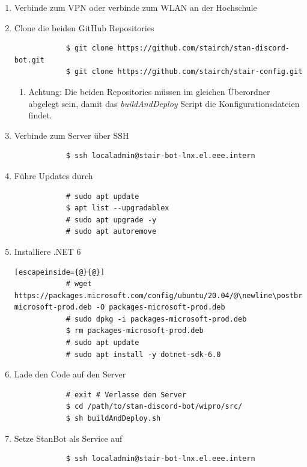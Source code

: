 \documentclass[a4paper, table]{article}
\begin{document}
\begin{enumerate}
    \item Verbinde zum VPN oder verbinde zum WLAN an der Hochschule
    \item Clone die beiden GitHub Repositories
        \begin{lstlisting}
            $ git clone https://github.com/stairch/stan-discord-bot.git
            $ git clone https://github.com/stairch/stair-config.git
        \end{lstlisting}
        \begin{enumerate}
            \item Achtung: Die beiden Repositories müssen im gleichen Überordner abgelegt sein, damit das \textit{buildAndDeploy} Script die Konfigurationsdateien findet.
        \end{enumerate}
    \item Verbinde zum Server über SSH
        \begin{lstlisting}
            $ ssh localadmin@stair-bot-lnx.el.eee.intern
        \end{lstlisting}
    \item Führe Updates durch
        \begin{lstlisting}
            # sudo apt update
            $ apt list --upgradablex
            # sudo apt upgrade -y
            # sudo apt autoremove
        \end{lstlisting}
    \item Installiere .NET 6
        \begin{lstlisting}[escapeinside={@}{@}]
            # wget https://packages.microsoft.com/config/ubuntu/20.04/@\newline\postbreak@packages-microsoft-prod.deb -O packages-microsoft-prod.deb
            # sudo dpkg -i packages-microsoft-prod.deb
            $ rm packages-microsoft-prod.deb
            # sudo apt update
            # sudo apt install -y dotnet-sdk-6.0
        \end{lstlisting}
    \item Lade den Code auf den Server
        \begin{lstlisting}
            # exit # Verlasse den Server
            $ cd /path/to/stan-discord-bot/wipro/src/
            $ sh buildAndDeploy.sh
        \end{lstlisting}
    \item Setze StanBot als Service auf
        \begin{lstlisting}
            $ ssh localadmin@stair-bot-lnx.el.eee.intern

\end{lstlisting}
\end{enumerate}
\end{document}
